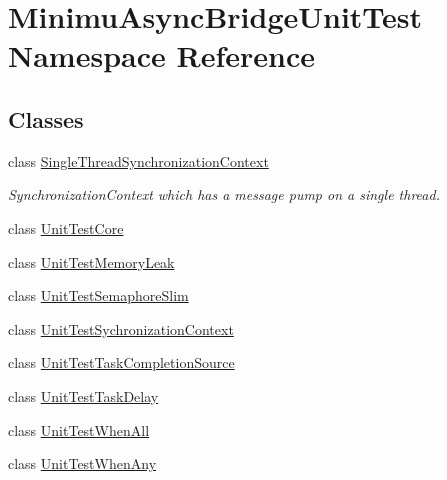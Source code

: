 \hypertarget{namespace_minimu_async_bridge_unit_test}{}\section{Minimu\+Async\+Bridge\+Unit\+Test Namespace Reference}
\label{namespace_minimu_async_bridge_unit_test}
\subsection*{Classes}
\begin{DoxyCompactItemize}
\item 
class \hyperlink{class_minimu_async_bridge_unit_test_1_1_single_thread_synchronization_context}{Single\+Thread\+Synchronization\+Context}
\begin{DoxyCompactList}\small\item\em Synchronization\+Context which has a message pump on a single thread. \end{DoxyCompactList}\item 
class \hyperlink{class_minimu_async_bridge_unit_test_1_1_unit_test_core}{Unit\+Test\+Core}
\item 
class \hyperlink{class_minimu_async_bridge_unit_test_1_1_unit_test_memory_leak}{Unit\+Test\+Memory\+Leak}
\item 
class \hyperlink{class_minimu_async_bridge_unit_test_1_1_unit_test_semaphore_slim}{Unit\+Test\+Semaphore\+Slim}
\item 
class \hyperlink{class_minimu_async_bridge_unit_test_1_1_unit_test_sychronization_context}{Unit\+Test\+Sychronization\+Context}
\item 
class \hyperlink{class_minimu_async_bridge_unit_test_1_1_unit_test_task_completion_source}{Unit\+Test\+Task\+Completion\+Source}
\item 
class \hyperlink{class_minimu_async_bridge_unit_test_1_1_unit_test_task_delay}{Unit\+Test\+Task\+Delay}
\item 
class \hyperlink{class_minimu_async_bridge_unit_test_1_1_unit_test_when_all}{Unit\+Test\+When\+All}
\item 
class \hyperlink{class_minimu_async_bridge_unit_test_1_1_unit_test_when_any}{Unit\+Test\+When\+Any}
\end{DoxyCompactItemize}

